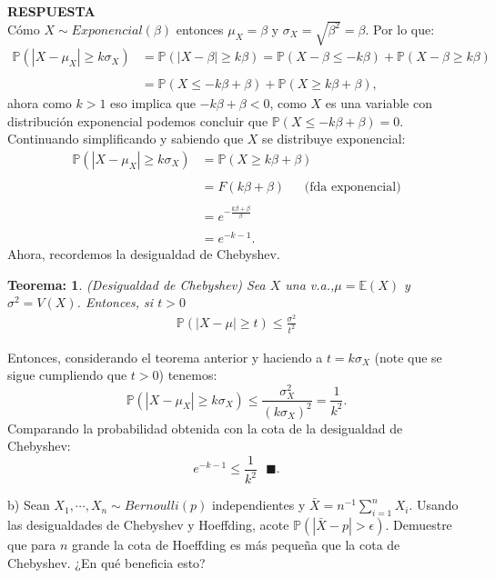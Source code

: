 \documentclass[11pt,letterpaper]{article}
\newcommand{\mP}{\mathbb{P}}
\newcommand{\mE}{\mathbb{E}}
\newcommand{\res}{\textbf{RESPUESTA}\\}
\newcommand{\finf}{\blacksquare.}
\newtheorem{thm}{Teorema:}
\begin{document}
\res  Cómo $X\sim Exponencial(\beta)$ entonces $\mu_X=\beta$ y $\sigma_X=\sqrt{\beta^2}=\beta.$ Por lo que:
\begin{align*}
\mP(|X-\mu_X |\geq k\sigma_X)&=\mP(|X-\beta|\geq k\beta)=\mP(X-\beta\leq -k\beta)+\mP(X-\beta\geq k\beta)\\ \\
&=\mP(X\leq -k\beta+\beta)+\mP(X\geq k\beta+\beta),
\end{align*}
ahora como $k>1$ eso implica que $-k\beta +\beta<0$, como $X$ es una variable con distribución exponencial podemos concluir que $\mP(X\leq -k\beta+\beta)=0$. Continuando simplificando y sabiendo que $X$ se distribuye exponencial:
\begin{align*}
\mP(|X-\mu_X |\geq k\sigma_X)&=\mP(X\geq k\beta+\beta)\\ \\
&=F(k\beta+\beta) \ \ \ \ \ \ \  \text{(fda exponencial)}\\ \\
&=e^{-\frac{k\beta+\beta}{\beta}}\\ \\
&=e^{-k-1}.
\end{align*}
Ahora, recordemos la desigualdad de Chebyshev.
\begin{framed}
    \begin{thm} \label{chebyshev}
    (Desigualdad de Chebyshev) Sea $X$ una v.a.,$\mu=\mE(X)$ y $\sigma^2=V(X)$. Entonces, si $t>0$
        \begin{align}
            \mP(|X-\mu|\geq t) \leq \frac{\sigma^2}{t^2}
        \end{align}
    \end{thm}
\end{framed} 
Entonces, considerando el teorema anterior y haciendo a $t=k\sigma_X$ (note que se sigue cumpliendo que $t>0$) tenemos:
$$\mP(|X-\mu_X|\geq k\sigma_X) \leq \frac{\sigma_X^2}{(k\sigma_X)^2}=\frac{1}{k^2}.$$
Comparando la probabilidad obtenida con la cota de la desigualdad de Chebyshev:
$$e^{-k-1}\leq \frac{1}{k^2}\ \ \ \finf$$

b) Sean $X_1,\cdots,X_n\sim Bernoulli(p)$ independientes y $\bar{X}=n^{-1}\sum_{i=1}^n X_i$. Usando las desigualdades de Chebyshev y Hoeffding, acote $\mP(|\bar{X}-p|>\epsilon)$. Demuestre que para $n$ grande la cota de Hoeffding es más pequeña que la cota de Chebyshev. ¿En qué beneficia esto?
\end{document}
